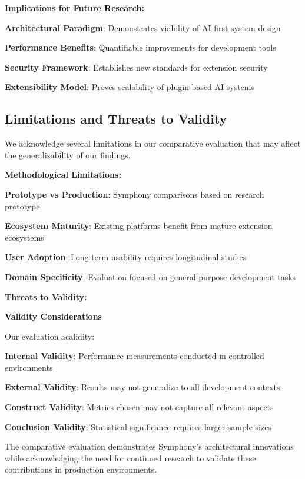 \textbf{Implications for Future Research:}

\begin{infobox}[title=Research Impact and Future Directions]
\begin{expandedlist}
    \item \textbf{Architectural Paradigm}: Demonstrates viability of AI-first system design
    \item \textbf{Performance Benefits}: Quantifiable improvements for development tools
    \item \textbf{Security Framework}: Establishes new standards for extension security
    \item \textbf{Extensibility Model}: Proves scalability of plugin-based AI systems
\end{expandedlist}
\end{infobox}

\subsection{Limitations and Threats to Validity}
\label{subsec:evaluation-limitations}

We acknowledge several limitations in our comparative evaluation that may affect the generalizability of our findings.

\textbf{Methodological Limitations:}

\begin{compactlist}
    \item \textbf{Prototype vs Production}: Symphony comparisons based on research prototype
    \item \textbf{Ecosystem Maturity}: Existing platforms benefit from mature extension ecosystems
    \item \textbf{User Adoption}: Long-term usability requires longitudinal studies
    \item \textbf{Domain Specificity}: Evaluation focused on general-purpose development tasks
\end{compactlist}

\textbf{Threats to Validity:}

\begin{alertbox}
\textbf{Validity Considerations}

Our evaluation acalidity:
\begin{compactlist}
    \item \textbf{Internal Validity}: Performance measurements conducted in controlled environments
    \item \textbf{External Validity}: Results may not generalize to all development contexts
    \item \textbf{Construct Validity}: Metrics chosen may not capture all relevant aspects
    \item \textbf{Conclusion Validity}: Statistical significance requires larger sample sizes
\end{compactlist}
\end{alertbox}

The comparative evaluation demonstrates Symphony's architectural innovations while acknowledging the need for continued research to validate these contributions in production environments.
